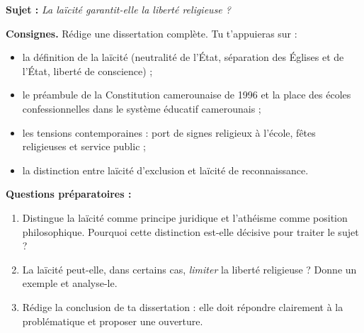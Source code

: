 \documentclass[11pt]{article}
\begin{document}
\begin{exercice}
\textbf{Sujet :} \emph{La laïcité garantit-elle la liberté religieuse ?}

\textbf{Consignes.} Rédige une dissertation complète. Tu t'appuieras sur :
\begin{itemize}
\item la définition de la laïcité (neutralité de l'État, séparation des Églises et de l'État, liberté de conscience) ;
\item le préambule de la Constitution camerounaise de 1996 et la place des écoles confessionnelles dans le système éducatif camerounais ;
\item les tensions contemporaines : port de signes religieux à l'école, fêtes religieuses et service public ;
\item la distinction entre laïcité d'exclusion et laïcité de reconnaissance.
\end{itemize}

\textbf{Questions préparatoires :}
\begin{enumerate}
\item Distingue la laïcité comme principe juridique et l'athéisme comme position philosophique. Pourquoi cette distinction est-elle décisive pour traiter le sujet ?
\item La laïcité peut-elle, dans certains cas, \emph{limiter} la liberté religieuse ? Donne un exemple et analyse-le.
\item Rédige la conclusion de ta dissertation : elle doit répondre clairement à la problématique et proposer une ouverture.
\end{enumerate}
\end{exercice}
\end{document}
